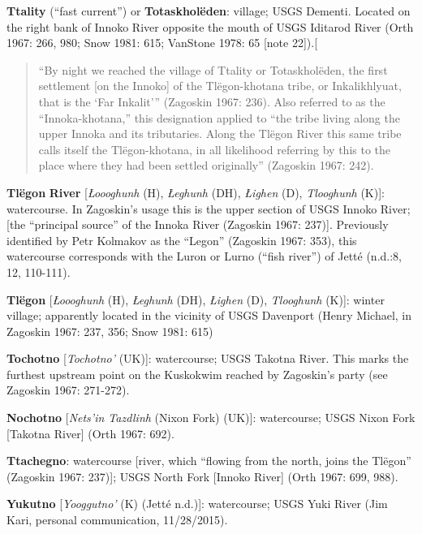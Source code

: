 \begin{hang}
\textbf{Ttality} (“fast current”) or \textbf{Totaskholëden}: village; USGS Dementi. Located on the right bank of Innoko River opposite the mouth of USGS Iditarod River (Orth 1967: 266, 980; Snow 1981: 615; VanStone 1978: 65 [note 22]).[



\begin{quote}“By night we reached the village of Ttality or Totaskholëden, the first settlement [on the Innoko] of the Tlëgon-khotana tribe, or Inkalikhlyuat, that is the ‘Far Inkalit’” (Zagoskin 1967: 236). Also referred to as the “Innoka-khotana,” this designation applied to “the tribe living along the upper Innoka and its tributaries. Along the Tlëgon River this same tribe calls itself the Tlëgon-khotana, in all likelihood referring by this to the place where they had been settled originally” (Zagoskin 1967: 242).
\end{quote}


\textbf{Tlëgon} \textbf{River} [\textit{Łoooghunh} (H), \textit{Łeghunh} (DH), \textit{Łighen} (D), \textit{Tlooghunh} (K)]: watercourse. In Zagoskin’s usage this is the upper section of USGS Innoko River; [the “principal source” of the Innoka River (Zagoskin 1967: 237)]. Previously identified by Petr Kolmakov as the “Legon” (Zagoskin 1967: 353), this watercourse corresponds with the Luron or Lurno (“fish river”) of Jetté (n.d.:8, 12, 110-111).



\textbf{Tlëgon} [\textit{Łoooghunh} (H), \textit{Łeghunh} (DH), \textit{Łighen} (D), \textit{Tlooghunh} (K)]: winter village; apparently located in the vicinity of USGS Davenport (Henry Michael, in Zagoskin 1967: 237, 356; Snow 1981: 615)



\textbf{Tochotno} [\textit{Tochotno’} (UK)]: watercourse; USGS Takotna River. This marks the furthest upstream point on the Kuskokwim reached by Zagoskin’s party (see Zagoskin 1967: 271-272).



\textbf{Nochotno} [\textit{Nets’in Tazdlinh} (Nixon Fork) (UK)]: watercourse; USGS Nixon Fork [Takotna River] (Orth 1967: 692).



\textbf{Ttachegno}: watercourse [river, which “flowing from the north, joins the Tlëgon” (Zagoskin 1967: 237)]; USGS North Fork [Innoko River] (Orth 1967: 699, 988).



\textbf{Yukutno} [\textit{Yooggutno’} (K) (Jetté n.d.)]: watercourse; USGS Yuki River (Jim Kari, personal communication, 11/28/2015).




\end{hang}

